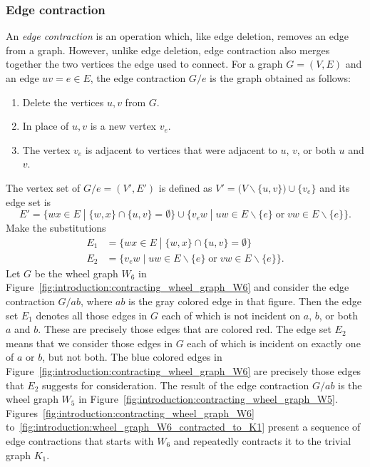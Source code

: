 
\subsubsection{Edge contraction}

An \emph{edge contraction} is an operation which, like edge deletion,
removes an edge from a graph. However, unlike edge deletion, edge
contraction also merges together the two vertices the edge used to
connect. For a graph $G = (V, E)$ and an edge $uv = e \in E$, the edge
contraction $G/e$ is the graph obtained as follows:
%
\begin{enumerate}
\item Delete the vertices $u,v$ from $G$.

\item In place of $u,v$ is a new vertex $v_e$.

\item The vertex $v_e$ is adjacent to vertices that were adjacent
  to $u$, $v$, or both $u$ and $v$.
\end{enumerate}
The vertex set of $G/e = (V', E')$ is defined as
$V' = \big(V \backslash \{u,v\}\big) \cup \{v_e\}$ and its edge set is
\[
E'
=
\big\{
wx \in E \;\left.\right|\; \{w,x\} \cap \{u,v\} = \emptyset
\big\}
\cup
\big\{
v_e w
\;\left.\right|\;
uw \in E \backslash \{e\} \;\text{or}\; vw \in E \backslash \{e\}
\big\}.
\]
Make the substitutions
%
\begin{align*}
E_1 &= \big\{
wx \in E \;\left.\right|\; \{w,x\} \cap \{u,v\} = \emptyset \big\} \\
E_2 &= \big\{
v_e w \;\left.\right|\;
uw \in E \backslash \{e\} \;\text{or}\; vw \in E \backslash \{e\} \big\}.
\end{align*}
%
Let $G$ be the wheel graph $W_6$ in
Figure~\ref{fig:introduction:contracting_wheel_graph_W6} and consider
the edge contraction $G/ab$, where $ab$ is the gray colored edge in
that figure. Then the edge set $E_1$ denotes all those edges in $G$
each of which is not incident on $a$, $b$, or both $a$ and $b$. These
are precisely those edges that are colored red. The edge set $E_2$
means that we consider those edges in $G$ each of which is incident on
exactly one of $a$ or $b$, but not both. The blue colored edges in
Figure~\ref{fig:introduction:contracting_wheel_graph_W6} are precisely
those edges that $E_2$ suggests for consideration. The result of the
edge contraction $G/ab$ is the wheel graph $W_5$ in
Figure~\ref{fig:introduction:contracting_wheel_graph_W5}.
Figures~\ref{fig:introduction:contracting_wheel_graph_W6}
to~\ref{fig:introduction:wheel_graph_W6_contracted_to_K1} present a
sequence of edge contractions that starts with $W_6$ and repeatedly
contracts it to the trivial graph $K_1$.

